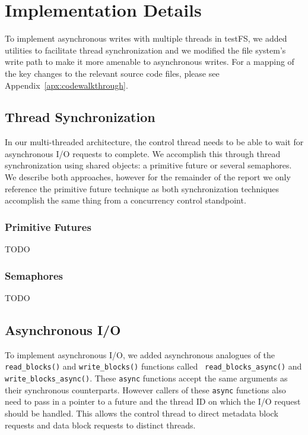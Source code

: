 \section{Implementation Details}
To implement asynchronous writes with multiple threads in testFS, we added
utilities to facilitate thread synchronization and we modified the file
system's write path to make it more amenable to asynchronous writes. For a
mapping of the key changes to the relevant source code files, please see
Appendix~\ref{apx:codewalkthrough}.

\subsection{Thread Synchronization}\label{sec:threadsync}
In our multi-threaded architecture, the control thread needs to be able to wait
for asynchronous I/O requests to complete. We accomplish this through thread
synchronization using shared objects: a primitive future or several
semaphores. We describe both approaches, however for the remainder of the
report we only reference the primitive future technique as both synchronization
techniques accomplish the same thing from a concurrency control standpoint.

\subsubsection{Primitive Futures}
TODO

\subsubsection{Semaphores}
TODO

\subsection{Asynchronous I/O}
To implement asynchronous I/O, we added asynchronous analogues of the {\tt
read\_blocks()} and {\tt write\_blocks()} functions called {\tt
read\_blocks\_async()} and {\tt write\_blocks\_async()}. These {\tt async}
functions accept the same arguments as their synchronous counterparts. However
callers of these {\tt async} functions also need to pass in a pointer to a
future and the thread ID on which the I/O request should be handled. This
allows the control thread to direct metadata block requests and data block
requests to distinct threads.

